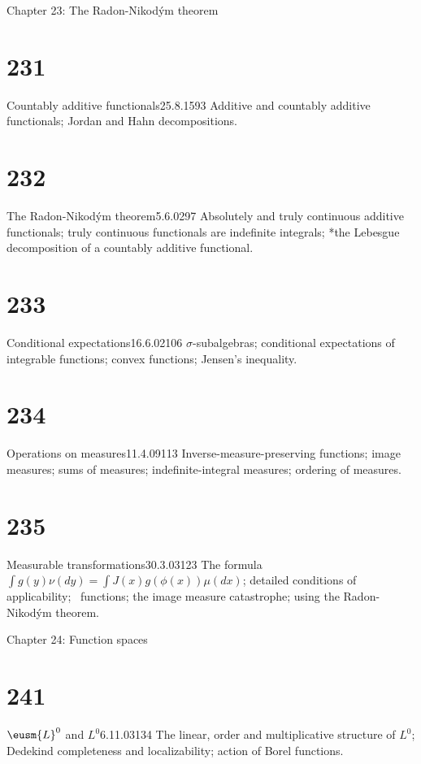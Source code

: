 
 Chapter 23: The Radon-Nikod\'ym theorem


\section{231}{Countably additive functionals}{25.8.15}{93}{}
{Additive and countably additive functionals;  Jordan and Hahn
decompositions.}

\section{232}{The Radon-Nikod\'ym theorem}{5.6.02}{97}{}
{Absolutely and truly continuous additive functionals;  truly
continuous functionals are indefinite integrals;  *the Lebesgue
decomposition of a countably additive functional.}

\section{233}{Conditional expectations}{16.6.02}{106}{}
{$\sigma$-subalgebras;  conditional expectations of integrable
functions;  convex functions;  Jensen's inequality.}

\section{234}{Operations on measures}{11.4.09}{113}{}
{Inverse-measure-preserving functions;  image measures;  sums of measures;
indefinite-integral measures;  ordering of measures.}

\section{235}{Measurable transformations}{30.3.03}{123}{}
{The formula ${\int}g(y)\nu(dy)={\int}J(x)g(\phi(x))\mu(dx)$;
detailed conditions of applicability;  \imp\ functions;  the image
measure catastrophe;  using the Radon-Nikod\'ym theorem.}


 Chapter 24:  Function spaces


\section{241}{$\eusm{L}^0$ and $L^0$}{6.11.03}{134}{}
{The linear, order and multiplicative structure of $L^0$;  Dedekind completeness and localizability;  action
of Borel functions.}

